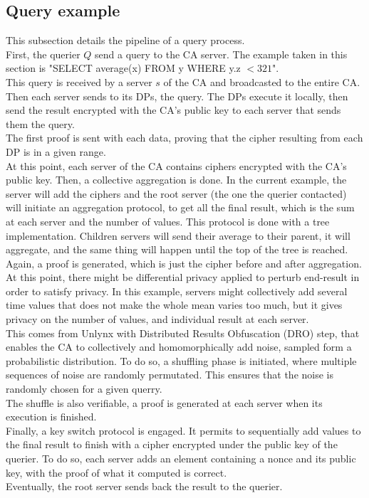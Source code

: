\documentclass{article}
\begin{document}
\subsection{Query example}
This subsection details the pipeline of a query process.\\
First, the querier $Q$ send a query to the CA server. The example taken in this section is "SELECT average(x) FROM y WHERE y.z $< 321$".\\
This query is received by a server $s$ of the CA and broadcasted to the entire CA. Then each server sends to its DPs, the query. The DPs execute it locally, then send the result encrypted with the CA's public key to each server that sends them the query.\\
The first proof is sent with each data, proving that the cipher resulting from each DP is in a given range.\\
At this point, each server of the CA contains ciphers encrypted with the CA's public key.
Then, a collective aggregation is done. In the current example, the server will add the ciphers and the root server (the one the querier contacted) will initiate an aggregation protocol, to get all the final result, which is the sum at each server and the number of values. This protocol is done with a tree implementation. Children servers will send their average to their parent, it will aggregate, and the same thing will happen until the top of the tree is reached.\\
Again, a proof is generated, which is just the cipher before and after aggregation.\\
At this point, there might be differential privacy applied to perturb end-result in order to satisfy privacy. In this example, servers might collectively add several time values that does not make the whole mean varies too much, but it gives privacy on the number of values, and individual result at each server.\\
This comes from Unlynx with Distributed Results Obfuscation (DRO) step, that enables the CA to collectively and homomorphically add noise, sampled form a probabilistic distribution.
To do so, a shuffling phase is initiated, where multiple sequences of noise are randomly permutated. This ensures that the noise is randomly chosen for a given querry.\\
The shuffle is also verifiable, a proof is generated at each server when its execution is finished.\\
Finally, a key switch protocol is engaged. It permits to sequentially add values to the final result to finish with a cipher encrypted under the public key of the querier. To do so, each server adds an element containing a nonce and its public key, with the proof of what it computed is correct.\\
Eventually, the root server sends back the result to the querier.\\
\end{document}
